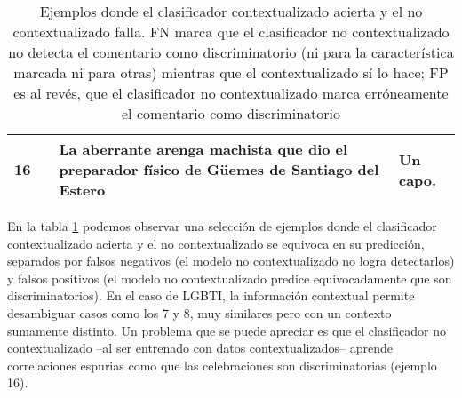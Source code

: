 \begin{table}[ht!]
\begin{tabular}{p{} p{} p{} p{}}
        16 &            & La aberrante arenga machista que dio el preparador físico de Güemes de Santiago del Estero & Un capo. \\
        \hline
    \end{tabular}
    \caption{Ejemplos donde el clasificador contextualizado acierta y el no contextualizado falla. FN marca que el clasificador no contextualizado no detecta el comentario como discriminatorio (ni para la característica marcada ni para otras) mientras que el contextualizado sí lo hace; FP es al revés, que el clasificador no contextualizado marca erróneamente el comentario como discriminatorio  }
    \label{tab:context_vs_no_context_error}
\end{table}


En la tabla \ref{tab:context_vs_no_context_error} podemos observar una selección de ejemplos donde el clasificador contextualizado acierta y el no contextualizado se equivoca en su predicción, separados por falsos negativos (el modelo no contextualizado no logra detectarlos) y falsos positivos (el modelo no contextualizado predice equivocadamente que son discriminatorios). En el caso de LGBTI, la información contextual permite desambiguar casos como los 7 y 8, muy similares pero con un contexto sumamente distinto. Un problema que se puede apreciar es que el clasificador no contextualizado --al ser entrenado con datos contextualizados-- aprende correlaciones espurias como que las celebraciones son discriminatorias (ejemplo 16).


